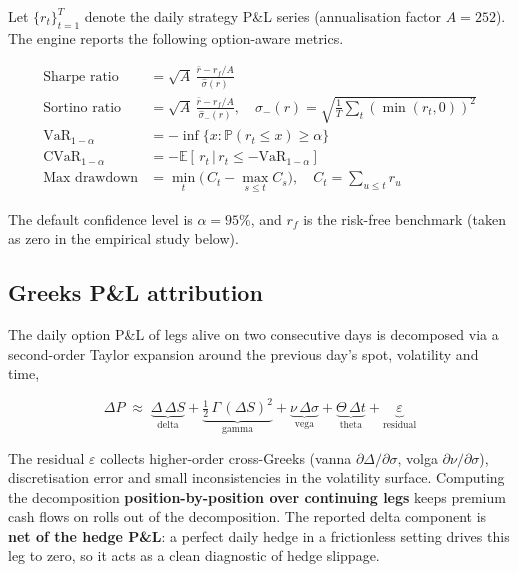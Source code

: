 \documentclass[11pt, a4paper]{article}
\theoremstyle{defstyle}
\begin{document}
Let $\{r_t\}_{t=1}^{T}$ denote the daily strategy P\&L series
(annualisation factor $A = 252$).
The engine reports the following option-aware metrics.

\begin{align}
    \text{Sharpe ratio}    &= \sqrt{A}\,\frac{\bar{r} - r_f / A}{\hat{\sigma}(r)} \\
    \text{Sortino ratio}   &= \sqrt{A}\,\frac{\bar{r} - r_f / A}{\hat{\sigma}_{\!-}(r)},
        \quad \hat{\sigma}_{\!-}(r) = \sqrt{\tfrac{1}{T}\!\sum_t (\min(r_t, 0))^2} \\
    \text{VaR}_{1-\alpha}  &= -\inf\{x : \mathbb{P}(r_t \le x) \ge \alpha\} \\
    \text{CVaR}_{1-\alpha} &= -\mathbb{E}\!\left[\,r_t \,\big|\, r_t \le -\text{VaR}_{1-\alpha}\right] \\
    \text{Max drawdown}    &= \min_{t} \Big(\,C_t - \max_{s \le t} C_s\Big),
        \quad C_t = \sum_{u \le t} r_u
\end{align}

The default confidence level is $\alpha = 95\%$, and $r_f$ is the risk-free
benchmark (taken as zero in the empirical study below).

\subsection{Greeks P\&L attribution}

The daily option P\&L of legs alive on two consecutive days is decomposed via a
second-order Taylor expansion around the previous day's spot, volatility and time,

\begin{equation}
    \Delta P
    \;\approx\;
    \underbrace{\Delta\,\Delta S}_{\text{delta}}
    + \underbrace{\tfrac{1}{2}\,\Gamma\,(\Delta S)^2}_{\text{gamma}}
    + \underbrace{\nu\,\Delta\sigma}_{\text{vega}}
    + \underbrace{\Theta\,\Delta t}_{\text{theta}}
    + \underbrace{\varepsilon}_{\text{residual}}
\end{equation}

The residual $\varepsilon$ collects higher-order cross-Greeks (vanna $\partial
\Delta / \partial \sigma$, volga $\partial \nu / \partial \sigma$),
discretisation error and small inconsistencies in the volatility surface.
Computing the decomposition \textbf{position-by-position over continuing legs}
keeps premium cash flows on rolls out of the decomposition.
The reported delta component is \textbf{net of the hedge P\&L}: a perfect
daily hedge in a frictionless setting drives this leg to zero, so it acts as a
clean diagnostic of hedge slippage.
\end{document}
